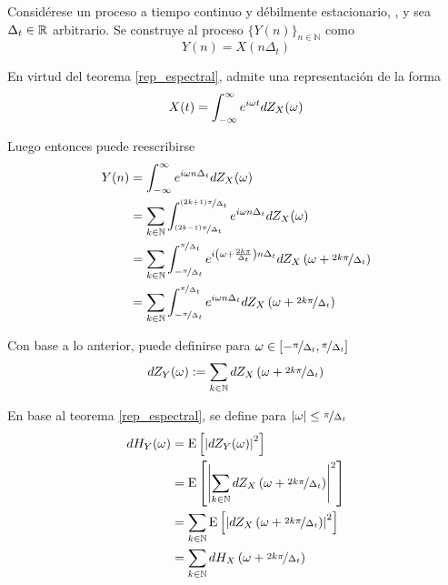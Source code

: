 Considérese un proceso a tiempo continuo y débilmente estacionario, \xt, y sea $\Delta_t \in \mathbb{R}$ arbitrario.
%
Se construye al proceso $\{Y(n)\}_{n\in \mathbb{N}}$ como
\begin{equation}
Y(n) = X(n \Delta_t)
\end{equation}

En virtud del teorema \ref{rep_espectral}, \xt admite una representación de la forma
\begin{equation}
X(t) = \int_{-\infty}^{\infty} e^{i \omega t }  dZ_X(\omega)
\end{equation}

Luego entonces puede reescribirse
\begin{align}
Y(n) &= \int_{-\infty}^{\infty} e^{i \omega n \Delta_t} dZ_X(\omega) \nonumber \\
&= \sum_{k \in \mathbb{N}} \int_{\nicefrac{(2k-1)\pi}{\Delta_t}}^{\nicefrac{(2k+1)\pi}{\Delta_t}}
e^{i \omega n \Delta_t} dZ_X(\omega) \nonumber \\
&= \sum_{k \in \mathbb{N}} \int_{-\nicefrac{\pi}{\Delta_t}}^{\nicefrac{\pi}{\Delta_t}}
e^{i \left( \omega + \frac{2 k \pi}{\Delta_t} \right) n \Delta_t}
dZ_X\left( \omega + \nicefrac{2 k \pi}{\Delta_t}\right) \nonumber \\
&= \sum_{k \in \mathbb{N}} \int_{-\nicefrac{\pi}{\Delta_t}}^{\nicefrac{\pi}{\Delta_t}}
e^{i \omega n \Delta_t}
dZ_X\left( \omega + \nicefrac{2 k \pi}{\Delta_t}\right)
\end{align}

Con base a lo anterior, puede definirse para 
$\omega \in \left[ -\nicefrac{\pi}{\Delta_t} , \nicefrac{\pi}{\Delta_t} \right]$
\begin{equation}
dZ_Y(\omega) := \sum_{k \in \mathbb{N}} dZ_X\left( \omega + \nicefrac{2 k \pi}{\Delta_t}\right)
\end{equation}

En base al teorema \ref{rep_espectral}, se define para 
$\left| \omega \right| \leq \nicefrac{\pi}{\Delta_t}$
\begin{align}
dH_Y(\omega) &= \mathrm{E}\left[ \left| dZ_Y(\omega) \right|^{2} \right] \nonumber \\
&= \mathrm{E}\left[ \left| \sum_{k \in \mathbb{N}} dZ_X\left( \omega + \nicefrac{2 k \pi}{\Delta_t}\right) \right|^{2} \right]
\nonumber \\
&= \sum_{k \in \mathbb{N}} \mathrm{E}\left[ \left| dZ_X\left( \omega + \nicefrac{2 k \pi}{\Delta_t}\right) \right|^{2} \right]
\nonumber \\
&= \sum_{k \in \mathbb{N}} dH_X\left( \omega + \nicefrac{2 k \pi}{\Delta_t}\right)
\end{align}

